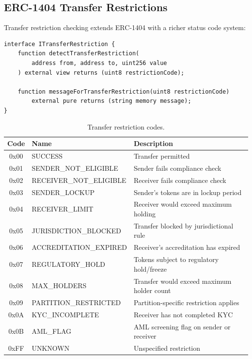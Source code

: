 \subsection{ERC-1404 Transfer Restrictions}

Transfer restriction checking extends ERC-1404 with a richer status code system:

\begin{lstlisting}[language=Solidity,caption={Transfer restriction interface.}]
interface ITransferRestriction {
    function detectTransferRestriction(
        address from, address to, uint256 value
    ) external view returns (uint8 restrictionCode);

    function messageForTransferRestriction(uint8 restrictionCode)
        external pure returns (string memory message);
}
\end{lstlisting}

\begin{table}[H]
\centering
\caption{Transfer restriction codes.}
\label{tab:restriction-codes}
\begin{tabular}{clp{6cm}}
\toprule
\textbf{Code} & \textbf{Name} & \textbf{Description} \\
\midrule
0x00 & SUCCESS & Transfer permitted \\
0x01 & SENDER\_NOT\_ELIGIBLE & Sender fails compliance check \\
0x02 & RECEIVER\_NOT\_ELIGIBLE & Receiver fails compliance check \\
0x03 & SENDER\_LOCKUP & Sender's tokens are in lockup period \\
0x04 & RECEIVER\_LIMIT & Receiver would exceed maximum holding \\
0x05 & JURISDICTION\_BLOCKED & Transfer blocked by jurisdictional rule \\
0x06 & ACCREDITATION\_EXPIRED & Receiver's accreditation has expired \\
0x07 & REGULATORY\_HOLD & Tokens subject to regulatory hold/freeze \\
0x08 & MAX\_HOLDERS & Transfer would exceed maximum holder count \\
0x09 & PARTITION\_RESTRICTED & Partition-specific restriction applies \\
0x0A & KYC\_INCOMPLETE & Receiver has not completed KYC \\
0x0B & AML\_FLAG & AML screening flag on sender or receiver \\
0xFF & UNKNOWN & Unspecified restriction \\
\bottomrule
\end{tabular}
\end{table}

